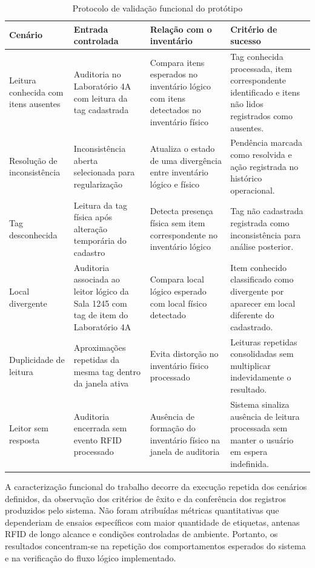 \begin{table}[H]
\centering
\scriptsize
\setlength{\tabcolsep}{3pt}
\renewcommand{\arraystretch}{1.12}
\caption{Protocolo de validação funcional do protótipo}
\label{tab:protocolo-validacao}
\begin{tabularx}{\textwidth}{>{\raggedright\arraybackslash}p{2.8cm}>{\raggedright\arraybackslash}p{3.2cm}>{\raggedright\arraybackslash}p{3.1cm}>{\raggedright\arraybackslash}X}
\toprule
\textbf{Cenário} & \textbf{Entrada controlada} & \textbf{Relação com o inventário} & \textbf{Critério de sucesso} \\
\midrule
Leitura conhecida com itens ausentes & Auditoria no Laboratório 4A com leitura da tag cadastrada & Compara itens esperados no inventário lógico com itens detectados no inventário físico & Tag conhecida processada, item correspondente identificado e itens não lidos registrados como ausentes. \\
Resolução de inconsistência & Inconsistência aberta selecionada para regularização & Atualiza o estado de uma divergência entre inventário lógico e físico & Pendência marcada como resolvida e ação registrada no histórico operacional. \\
Tag desconhecida & Leitura da tag física após alteração temporária do cadastro & Detecta presença física sem item correspondente no inventário lógico & Tag não cadastrada registrada como inconsistência para análise posterior. \\
Local divergente & Auditoria associada ao leitor lógico da Sala 1245 com tag de item do Laboratório 4A & Compara local lógico esperado com local físico detectado & Item conhecido classificado como divergente por aparecer em local diferente do cadastrado. \\
Duplicidade de leitura & Aproximações repetidas da mesma tag dentro da janela ativa & Evita distorção no inventário físico processado & Leituras repetidas consolidadas sem multiplicar indevidamente o resultado. \\
Leitor sem resposta & Auditoria encerrada sem evento RFID processado & Ausência de formação do inventário físico na janela de auditoria & Sistema sinaliza ausência de leitura processada sem manter o usuário em espera indefinida. \\
\bottomrule
\end{tabularx}
\end{table}
\normalsize
\renewcommand{\arraystretch}{1}

A caracterização funcional do trabalho decorre da execução repetida dos cenários definidos, da observação dos critérios de êxito e da conferência dos registros produzidos pelo sistema. Não foram atribuídas métricas quantitativas que dependeriam de ensaios específicos com maior quantidade de etiquetas, antenas RFID de longo alcance e condições controladas de ambiente. Portanto, os resultados concentram-se na repetição dos comportamentos esperados do sistema e na verificação do fluxo lógico implementado.
